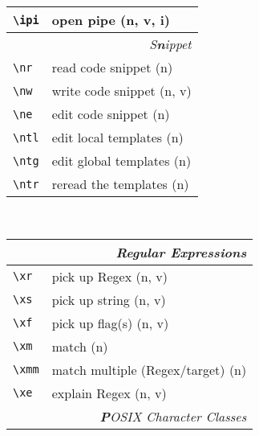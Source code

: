 \documentclass[oneside,10pt,landscape,DIV17]{scrartcl}
\begin{document}
\begin{multicols}{3}
\begin{center}
\begin{tabular}[]{|p{13mm}|p{56mm}|}
\hline \verb'\ipi' & open pipe                 \hfill (n, v, i)\\
\hline
\hline
\multicolumn{2}{|r|}{\textsl{S\textbf{n}ippet}}             \\[1.0ex]
\hline \verb'\nr'  & read code snippet         \hfill (n)   \\
\hline \verb'\nw'  & write code snippet        \hfill (n, v)\\
\hline \verb'\ne'  & edit code snippet         \hfill (n)   \\
%
\hline \verb'\ntl' & edit local templates      \hfill (n)   \\
\hline \verb'\ntg' & edit global templates     \hfill (n)   \\
\hline \verb'\ntr' & reread the templates      \hfill (n)   \\
\hline
\end{tabular}\\
%
%
\begin{tabular}[]{|p{11mm}|p{58mm}|}
\hline
\multicolumn{2}{|r|}{\textsl{Regular E\textbf{x}pressions}} \\[1.0ex]
\hline \verb'\xr' &  pick up Regex                 \hfill (n, v)\\
\hline \verb'\xs' &  pick up string                \hfill (n, v)\\
\hline \verb'\xf' &  pick up flag(s)               \hfill (n, v)\\
\hline \verb'\xm' &  match                         \hfill (n)   \\
\hline \verb'\xmm'&  match multiple (Regex/target) \hfill (n)   \\
\hline \verb'\xe' &  explain Regex                 \hfill (n, v)\\
\hline
\hline
\multicolumn{2}{|r|}{\textsl{\textbf{P}OSIX Character Classes}}\\[1.0ex]

\end{tabular}
\end{center}
\end{multicols}
\end{document}
